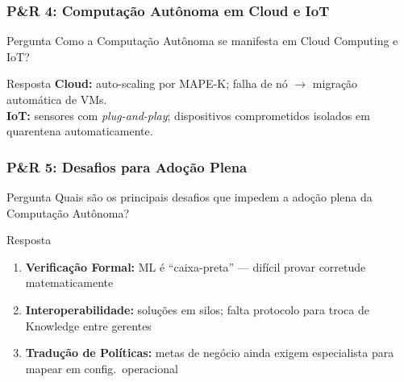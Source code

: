 \documentclass{beamer}
\begin{document}
  \begin{frame}
    \frametitle{P\&R 4: Computação Autônoma em Cloud e IoT}
    \begin{alertblock}{Pergunta}
      Como a Computação Autônoma se manifesta em Cloud Computing e IoT?
    \end{alertblock}
    \begin{block}{Resposta}
      \footnotesize
      \textbf{Cloud:} auto-scaling por MAPE-K; falha de nó $\rightarrow$ migração automática de VMs.\\[0.15cm]
      \textbf{IoT:} sensores com \textit{plug-and-play}; dispositivos comprometidos isolados em quarentena automaticamente.
    \end{block}
  \end{frame}

  \begin{frame}
    \frametitle{P\&R 5: Desafios para Adoção Plena}
    \begin{alertblock}{Pergunta}
      Quais são os principais desafios que impedem a adoção plena da Computação Autônoma?
    \end{alertblock}
    \begin{block}{Resposta}
      \footnotesize
      \begin{enumerate}
        \item \textbf{Verificação Formal:} ML é ``caixa-preta'' --- difícil provar corretude matematicamente
        \item \textbf{Interoperabilidade:} soluções em silos; falta protocolo para troca de Knowledge entre gerentes
        \item \textbf{Tradução de Políticas:} metas de negócio ainda exigem especialista para mapear em config.\ operacional
      \end{enumerate}
    \end{block}
  \end{frame}
\end{document}
